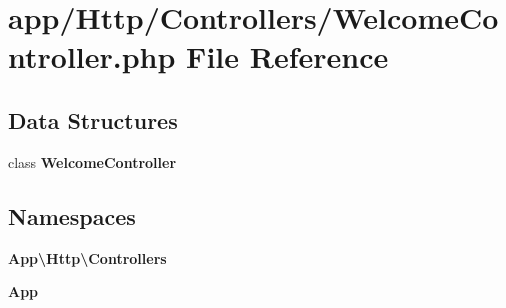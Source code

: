 \section{app/\+Http/\+Controllers/\+Welcome\+Controller.php File Reference}
\label{_welcome_controller_8php}
\subsection*{Data Structures}
\begin{DoxyCompactItemize}
\item 
class {\bf Welcome\+Controller}
\end{DoxyCompactItemize}
\subsection*{Namespaces}
\begin{DoxyCompactItemize}
\item 
 {\bf App\textbackslash{}\+Http\textbackslash{}\+Controllers}
\item 
 {\bf App}
\end{DoxyCompactItemize}
